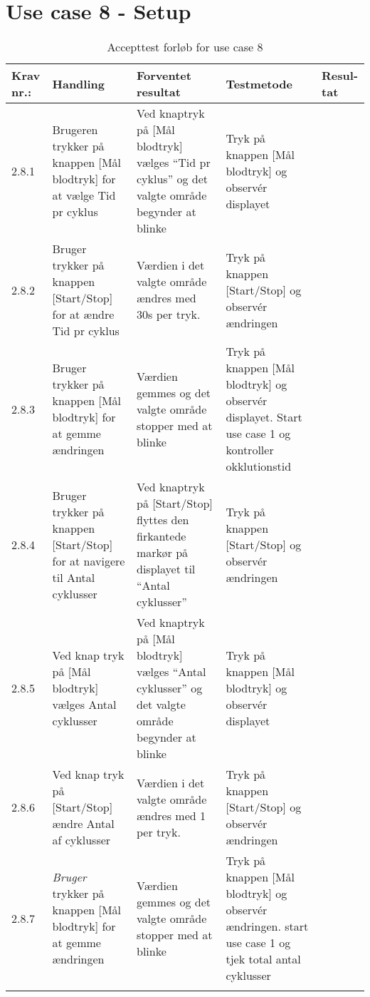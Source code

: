 \newpage
	\section{Use case 8 - Setup}
						\begin{longtable}{|p{}|p{0.23\textwidth}|p{}|p{}|p{}|}
							\hline
							\rowcolor{usDef}
							Krav nr.: & Handling & Forventet resultat & Testmetode & Resul-tat  \\\hline
							2.8.1 & Brugeren trykker på knappen [Mål blodtryk] for at vælge Tid pr cyklus & Ved knaptryk på [Mål blodtryk] vælges “Tid pr cyklus” og det valgte område begynder at blinke & Tryk på knappen [Mål blodtryk] og observér displayet & \\ \hline
							2.8.2 & Bruger trykker på knappen [Start/Stop] for at ændre Tid pr cyklus & Værdien i det valgte område ændres med 30s per tryk. & Tryk på knappen [Start/Stop] og observér ændringen  & \\ \hline
							2.8.3 & Bruger trykker på knappen [Mål blodtryk] for at gemme ændringen & Værdien gemmes og det valgte område stopper med at blinke & Tryk på knappen [Mål blodtryk] og observér displayet. Start use case 1 og kontroller okklutionstid & \\ \hline
							2.8.4 & Bruger trykker på knappen [Start/Stop] for at navigere til Antal cyklusser & Ved knaptryk på [Start/Stop] flyttes den firkantede markør på displayet til “Antal cyklusser” & Tryk på knappen [Start/Stop] og observér ændringen  & \\ \hline
							2.8.5 & Ved knap tryk på [Mål blodtryk] vælges Antal cyklusser & Ved knaptryk på [Mål blodtryk] vælges “Antal cyklusser” og det valgte område begynder at blinke & Tryk på knappen [Mål blodtryk] og observér displayet & \\ \hline
							2.8.6 & Ved knap tryk på [Start/Stop] ændre Antal af cyklusser & Værdien i det valgte område ændres med 1 per tryk. & Tryk på knappen [Start/Stop] og observér ændringen & \\ \hline
							2.8.7 & \textit{Bruger} trykker på knappen [Mål blodtryk] for at gemme ændringen & Værdien gemmes og det valgte område stopper med at blinke & Tryk på knappen [Mål blodtryk] og observér ændringen.
							start use case 1 og tjek total antal cyklusser & \\ \hline
							\caption{Accepttest forløb for use case 8}
						\end{longtable}		